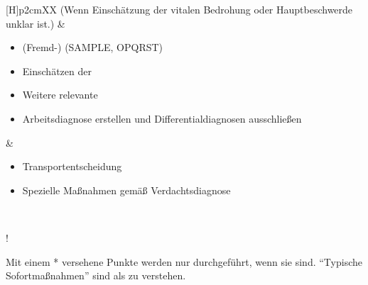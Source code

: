 {\begin{minipage}[t]{\linewidth -
{2\fboxrule} - {2\fboxsep}}
\begin{minipage}[t]{\linewidth}
{\begin{tabularx}{\linewidth}[H]{p{2cm}XX}
{\tiny (Wenn Einschätzung der vitalen
Bedrohung oder Hauptbeschwerde unklar ist.)}
&
\begin{minipage}[t]{\linewidth}
\begin{itemize}
  \item (Fremd-)  (SAMPLE, OPQRST)
  \item Einschätzen der 
  \item Weitere relevante 
  \item Arbeitsdiagnose erstellen und Differentialdiagnosen
  ausschließen
\end{itemize}
\end{minipage}
&
\noindent\color{Indigo}\begin{minipage}[t]{\linewidth}
\begin{itemize}
  \item Transportentscheidung 
  \item Spezielle Maßnahmen gemäß Verdachtsdiagnose
\end{itemize}
\end{minipage}
\\\addlinespace\bottomrule
\end{tabularx}

\begin{center}
  !

{\tiny Mit einem * versehene Punkte werden nur durchgeführt,
wenn sie  sind. \enquote{Typische
Sofortmaßnahmen} sind als  zu verstehen.}
\end{center}
}
\end{minipage}
\end{minipage}\vspace{-\baselineskip}
}






